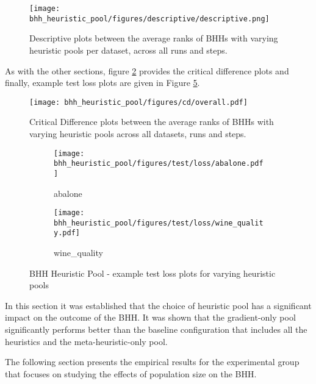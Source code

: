 \begin{figure}[htbp]
	\centering
	\texttt{[image: bhh\_heuristic\_pool/figures/descriptive/descriptive.png]}
	\caption{Descriptive plots between the average ranks of \Acsp{BHH} with varying heuristic pools per dataset, across all runs and steps.}
	\label{fig:results:heuristic_pool:descriptive:descriptive}
\end{figure}

As with the other sections, figure \ref{fig:results:heuristic_pool:descriptive:cd} provides the critical difference plots and finally, example test loss plots are given in Figure \ref{fig:results:heuristic_pool:figures:loss}.

\begin{figure}[htbp]
	\centering
	\texttt{[image: bhh\_heuristic\_pool/figures/cd/overall.pdf]}
	\caption{Critical Difference plots between the average ranks of \Acsp{BHH} with varying heuristic pools across all datasets, runs and steps.}
	\label{fig:results:heuristic_pool:descriptive:cd}
\end{figure}



\begin{figure}[htbp]
	\begin{subfigure}{0.5\textwidth}
		\centering
		\texttt{[image: bhh\_heuristic\_pool/figures/test/loss/abalone.pdf]}
		\caption{abalone}
		\label{fig:results:heuristic_pool:figures:loss1}
	\end{subfigure}
	\begin{subfigure}{0.5\textwidth}
		\centering
		\texttt{[image: bhh\_heuristic\_pool/figures/test/loss/wine\_quality.pdf]}
		\caption{wine\_quality}
		\label{fig:results:heuristic_pool:figures:loss2}
	\end{subfigure}
	\caption{\Acs{BHH} Heuristic Pool - example test loss plots for varying heuristic pools}
	\label{fig:results:heuristic_pool:figures:loss}
\end{figure}

In this section it was established that the choice of heuristic pool has a significant impact on the outcome of the \Ac{BHH}. It was shown that the gradient-only pool significantly performs better than the baseline configuration that includes all the heuristics and the meta-heuristic-only pool.

The following section presents the empirical results for the experimental group that focuses on studying the effects of population size on the \Ac{BHH}.




